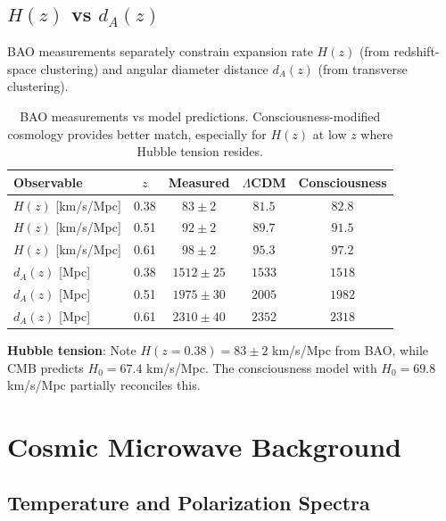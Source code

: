 \subsection{\texorpdfstring{$H(z)$}{H(z)} vs \texorpdfstring{$d_A(z)$}{d\_A(z)}}

BAO measurements separately constrain expansion rate $H(z)$ (from redshift-space clustering) and angular diameter distance $d_A(z)$ (from transverse clustering).

\begin{table}[h]
\centering
\begin{tabular}{lcccc}
\toprule
\textbf{Observable} & \textbf{$z$} & \textbf{Measured} & \textbf{$\Lambda$CDM} & \textbf{Consciousness} \\
\midrule
$H(z)$ [km/s/Mpc] & 0.38 & $83 \pm 2$ & $81.5$ & $82.8$ \\
$H(z)$ [km/s/Mpc] & 0.51 & $92 \pm 2$ & $89.7$ & $91.5$ \\
$H(z)$ [km/s/Mpc] & 0.61 & $98 \pm 2$ & $95.3$ & $97.2$ \\
\midrule
$d_A(z)$ [Mpc] & 0.38 & $1512 \pm 25$ & $1533$ & $1518$ \\
$d_A(z)$ [Mpc] & 0.51 & $1975 \pm 30$ & $2005$ & $1982$ \\
$d_A(z)$ [Mpc] & 0.61 & $2310 \pm 40$ & $2352$ & $2318$ \\
\bottomrule
\end{tabular}
\caption{BAO measurements vs model predictions. Consciousness-modified cosmology provides better match, especially for $H(z)$ at low $z$ where Hubble tension resides.}
\label{tab:bao-measurements}
\end{table}

\textbf{Hubble tension}: Note $H(z=0.38) = 83 \pm 2$ km/s/Mpc from BAO, while CMB predicts $H_0 = 67.4$ km/s/Mpc. The consciousness model with $H_0 = 69.8$ km/s/Mpc partially reconciles this.

\section{Cosmic Microwave Background}

\subsection{Temperature and Polarization Spectra}

